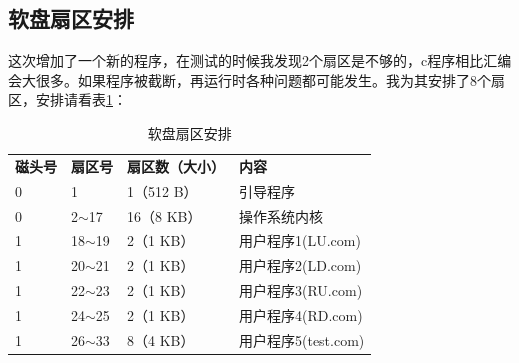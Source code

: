 \documentclass[a4paper, 11pt]{article} %
\begin{document}
\subsection{软盘扇区安排}
这次增加了一个新的程序，在测试的时候我发现2个扇区是不够的，c程序相比汇编会大很多。如果程序被截断，再运行时各种问题都可能发生。我为其安排了8个扇区，安排请看表\ref{tab:sectortable}：

\FloatBarrier
\begin{table}[]
\centering
  \caption{软盘扇区安排}
  \label{tab:sectortable}
  \begin{tabular}{llll}
  \rowcolor[HTML]{FFFFFF} 
  {\color[HTML]{333333} \textbf{磁头号}} & {\color[HTML]{333333} \textbf{扇区号}} & {\color[HTML]{333333} \textbf{扇区数（大小）}} & {\color[HTML]{333333} \textbf{内容}} \\
  \rowcolor[HTML]{FFFFFF} 
  {\color[HTML]{333333} 0}            & {\color[HTML]{333333} 1}            & {\color[HTML]{333333} 1（512 B）}         & {\color[HTML]{333333} 引导程序}        \\
  \rowcolor[HTML]{FFFFFF} 
  {\color[HTML]{333333} 0}            & {\color[HTML]{333333} 2$\sim$17}    & {\color[HTML]{333333} 16（8 KB）}         & {\color[HTML]{333333} 操作系统内核}      \\
  \rowcolor[HTML]{F8F8F8} 
  {\color[HTML]{333333} 1}            & {\color[HTML]{333333} 18$\sim$19}     & {\color[HTML]{333333} 2（1 KB）}          & {\color[HTML]{333333} 用户程序1(LU.com)}       \\
  \rowcolor[HTML]{FFFFFF} 
  {\color[HTML]{333333} 1}            & {\color[HTML]{333333} 20$\sim$21}     & {\color[HTML]{333333} 2（1 KB）}          & {\color[HTML]{333333} 用户程序2(LD.com)}       \\
  \rowcolor[HTML]{F8F8F8} 
  {\color[HTML]{333333} 1}            & {\color[HTML]{333333} 22$\sim$23}     & {\color[HTML]{333333} 2（1 KB）}          & {\color[HTML]{333333} 用户程序3(RU.com)}       \\
  \rowcolor[HTML]{FFFFFF} 
  {\color[HTML]{333333} 1}            & {\color[HTML]{333333} 24$\sim$25}     & {\color[HTML]{333333} 2（1 KB）}          & {\color[HTML]{333333} 用户程序4(RD.com)}      \\
  \rowcolor[HTML]{FFFFFF} 
  {\color[HTML]{333333} 1}            & {\color[HTML]{333333} 26$\sim$33}     & {\color[HTML]{333333} 8（4 KB）}          & {\color[HTML]{333333} 用户程序5(test.com)}      
  \end{tabular}
  \end{table}
\end{document}

